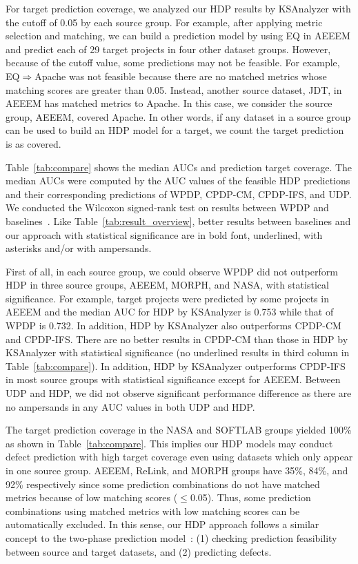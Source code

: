 For target prediction coverage, we analyzed our HDP results by KSAnalyzer with
the cutoff of 0.05 by each source group. For example, after applying
metric selection and matching, we can build a prediction model by using EQ in
AEEEM and predict each of 29 target projects in four other dataset
groups. However, because of the cutoff value, some predictions may not be
feasible. For example, EQ$\Rightarrow$Apache was not feasible because there are
no matched metrics whose matching scores are greater than 0.05.
Instead, another source dataset, JDT, in AEEEM has
matched metrics to Apache. In this case, we consider
the source group, AEEEM, covered Apache. In other words, if
any dataset in a source group can be used to build an HDP model for a target, we
count the target prediction is as covered.

Table~\ref{tab:compare} shows the median AUCs and
prediction target coverage. The median AUCs were computed by the AUC
values of the feasible HDP predictions and their corresponding predictions of
WPDP, CPDP-CM, CPDP-IFS, and UDP. We conducted the Wilcoxon
signed-rank test on results between WPDP and baselines~\cite{Wilcoxon45}. Like
Table~\ref{tab:result_overview}, better results between baselines and our
approach with statistical significance are in bold font, underlined, with asterisks and/or with
ampersands.%

First of all, in each source group, we could observe WPDP did not outperform HDP in three source groups, AEEEM, MORPH, and NASA, with statistical significance.
For example, target projects were predicted by some projects in AEEEM and
the median AUC for HDP by KSAnalyzer is 0.753 while that of
WPDP is 0.732. In addition,
HDP by KSAnalyzer also
outperforms CPDP-CM and CPDP-IFS.
There are no better results in CPDP-CM
than those in HDP by KSAnalyzer with statistical significance (no
underlined results in third column in Table~\ref{tab:compare}). In addition, HDP
by KSAnalyzer outperforms CPDP-IFS in most source groups with statistical significance except for AEEEM. Between UDP and HDP, we did not observe significant performance difference as there are no ampersands in any AUC values in both UDP and HDP.

The target prediction coverage in the NASA and SOFTLAB groups yielded 100\% as
shown in Table~\ref{tab:compare}. This implies our HDP models may conduct defect
prediction with high target coverage even using datasets which only appear in
one source group. AEEEM, ReLink, and MORPH groups have 35\%, 84\%, and 92\% respectively
since some prediction combinations do not have matched metrics because of low matching scores ($\leq$0.05).
Thus, some prediction combinations
using matched metrics with low matching scores can be automatically excluded. In
this sense, our HDP approach follows a similar concept to the two-phase
prediction model~\cite{Kim13}: (1) checking prediction feasibility between
source and target datasets, and (2) predicting defects.

